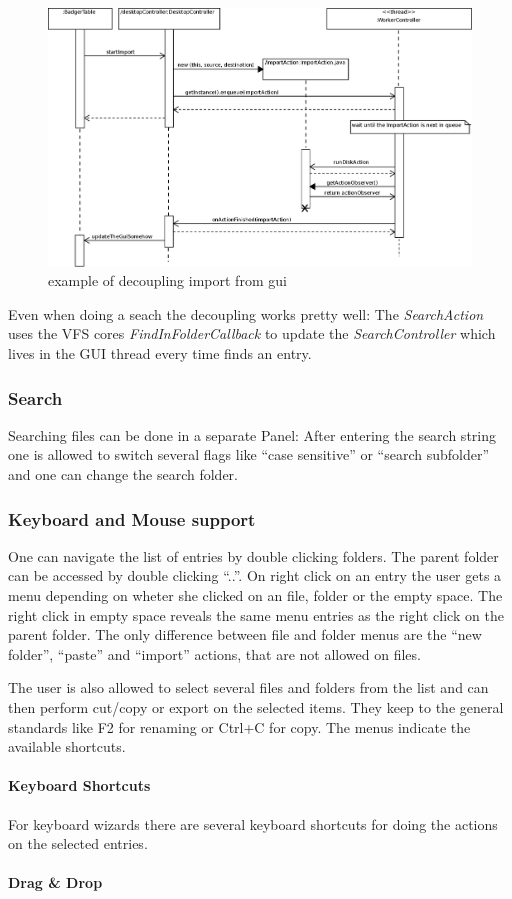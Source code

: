 \begin{figure}[h!]
\centering
\includegraphics[width=1\textwidth]{figures/single_threaded_access.eps}
\caption{example of decoupling import from gui}
\label{fig:decouple_threads}
\end{figure}

Even when doing a seach the decoupling works pretty well: The
\textit{SearchAction} uses the VFS cores \textit{FindInFolderCallback} to update
the \textit{SearchController} which lives in the GUI thread every time finds an
entry.

\subsubsection{Search}
Searching files can be done in a separate Panel: After entering the search
string one is allowed to switch several flags like ``case sensitive'' or
``search subfolder'' and one can change the search folder.


\subsubsection{Keyboard and Mouse support}
One can navigate the list of entries by double clicking folders. The parent
folder can be accessed by double clicking ``..''. On right click on an entry the
user gets a menu depending on wheter she clicked on an file, folder or the empty
space. The right click in empty space reveals the same menu entries as the right
click on the parent folder. The only difference between file and folder menus
are the ``new folder'', ``paste'' and ``import'' actions, that are not allowed
on files.

The user is also allowed to select several files and folders from the list and
can then perform cut/copy or export on the selected items. They keep to the
general standards like F2 for renaming or Ctrl+C for copy. The menus indicate
the available shortcuts.


\paragraph{Keyboard Shortcuts}
For keyboard wizards there are several keyboard shortcuts for doing the actions
on the selected entries.
\paragraph{Drag \& Drop}